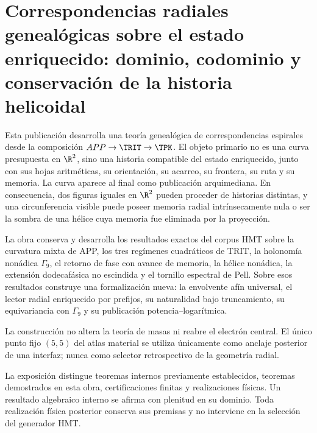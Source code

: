 \part{Correspondencias radiales genealógicas sobre el estado enriquecido: dominio, codominio y conservación de la historia helicoidal}
Esta publicación desarrolla una teoría genealógica de correspondencias
espirales desde la composición \(APP\to\TRIT\to\TPK\). El objeto primario
no es una curva presupuesta en \(\R^2\), sino una historia compatible del
estado enriquecido, junto con sus hojas aritméticas, su orientación, su
acarreo, su frontera, su ruta y su memoria. La curva aparece al final como
publicación arquimediana. En consecuencia, dos figuras iguales en
\(\R^2\) pueden proceder de historias distintas, y una circunferencia
visible puede poseer memoria radial intrínsecamente nula o ser la sombra de
una hélice cuya memoria fue eliminada por la proyección.

La obra conserva y desarrolla los resultados exactos del corpus HMT sobre
la curvatura mixta de APP, los tres regímenes cuadráticos de TRIT, la
holonomía nonádica \(\Gamma_9\), el retorno de fase con avance de memoria,
la hélice nonádica, la extensión dodecafásica no escindida y el tornillo
espectral de Pell. Sobre esos resultados construye una formalización nueva:
la envolvente afín universal, el lector radial enriquecido por prefijos, su
naturalidad bajo truncamiento, su equivariancia con \(\Gamma_9\) y su
publicación potencia--logarítmica.

La construcción no altera la teoría de masas ni reabre el electrón central.
El único punto fijo \((5,5)\) del atlas material se utiliza únicamente como
anclaje posterior de una interfaz; nunca como selector retrospectivo de la
geometría radial.

\medskip
\begin{statusbox}[title={Estratificación probatoria por dominio y codominio}]
La exposición distingue teoremas internos previamente establecidos, teoremas
demostrados en esta obra, certificaciones finitas y realizaciones físicas. Un
resultado algebraico interno se afirma con plenitud en su dominio. Toda
realización física posterior conserva sus premisas y no interviene en la
selección del generador HMT.
\end{statusbox}


